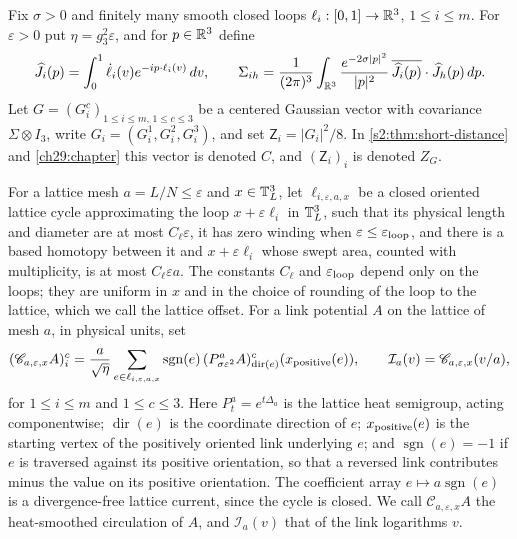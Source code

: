 \begin{definition}\label{ch28:def:closed-current-target}
Fix $\sigma>0$ and finitely many smooth closed loops $\ell_i:[0,1]\to\mathbb R^3$, $1\le i\le m$. For $\varepsilon>0$ put $\eta=g_3^2\varepsilon$, and for $p\in\mathbb R^3$ define
\[
 \widehat J_i(p)=\int_0^1\dot\ell_i(v)e^{-ip\cdot\ell_i(v)}\,dv,\qquad
 \Sigma_{ih}=\frac1{(2\pi)^3}\int_{\mathbb R^3}\frac{e^{-2\sigma|p|^2}}{|p|^2}\,\overline{\widehat J_i(p)}\cdot\widehat J_h(p)\,dp.
\]
Let $G=(G_i^c)_{1\le i\le m,\,1\le c\le3}$ be a centered Gaussian vector with covariance $\Sigma\otimes I_3$, write $G_i=(G_i^1,G_i^2,G_i^3)$, and set $\mathsf Z_i=|G_i|^2/8$. In \cref{s2:thm:short-distance} and \cref{ch29:chapter} this vector is denoted $C$, and $(\mathsf Z_i)_i$ is denoted $Z_G$.

For a lattice mesh $a=L/N\le\varepsilon$ and $x\in\mathbb T_L^3$, let $\ell_{i,\varepsilon,a,x}$ be a closed oriented lattice cycle approximating the loop $x+\varepsilon\ell_i$ in $\mathbb T_L^3$, such that its physical length and diameter are at most $C_\ell\varepsilon$, it has zero winding when $\varepsilon\le\varepsilon_{\rm loop}$, and there is a based homotopy between it and $x+\varepsilon\ell_i$ whose swept area, counted with multiplicity, is at most $C_\ell\varepsilon a$. The constants $C_\ell$ and $\varepsilon_{\rm loop}$ depend only on the loops; they are uniform in $x$ and in the choice of rounding of the loop to the lattice, which we call the lattice offset. For a link potential $A$ on the lattice of mesh $a$, in physical units, set
\[
 (\mathscr C_{a,\varepsilon,x}A)_i^c=\frac a{\sqrt\eta}\sum_{e\in\ell_{i,\varepsilon,a,x}}\operatorname{sgn}(e)\,(P^a_{\sigma\varepsilon^2}A)^c_{\operatorname{dir}(e)}(x_{\rm positive}(e)),\qquad \mathcal I_a(v)=\mathscr C_{a,\varepsilon,x}(v/a),
\]
for $1\le i\le m$ and $1\le c\le3$. Here $P^a_t=e^{t\Delta_a}$ is the lattice heat semigroup, acting componentwise; $\operatorname{dir}(e)$ is the coordinate direction of $e$; $x_{\rm positive}(e)$ is the starting vertex of the positively oriented link underlying $e$; and $\operatorname{sgn}(e)=-1$ if $e$ is traversed against its positive orientation, so that a reversed link contributes minus the value on its positive orientation. The coefficient array $e\mapsto a\operatorname{sgn}(e)$ is a divergence-free lattice current, since the cycle is closed. We call $\mathscr C_{a,\varepsilon,x}A$ the heat-smoothed circulation of $A$, and $\mathcal I_a(v)$ that of the link logarithms $v$.


\end{definition}

